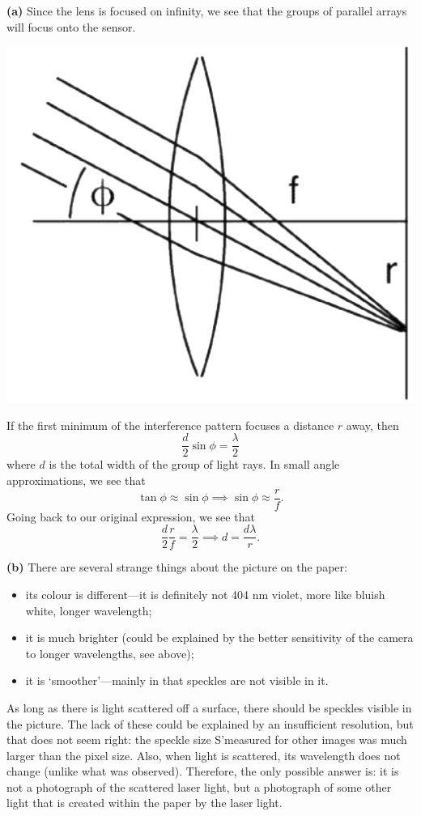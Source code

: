 \begin{custom-simple}[Problem 19]
\textbf{(a)} Since the lens is focused on infinity, we see that the groups of parallel arrays will focus onto the sensor. 
\begin{center}
    \includegraphics[width=0.5\linewidth]{kalda-physics-cup.png}
\end{center}
\vspace{5mm}
If the first minimum of the interference pattern focuses a distance $r$ away, then 
\[\frac{d}{2}\sin\phi = \frac{\lambda}{2}\]
where $d$ is the total width of the group of light rays. In small angle approximations, we see that 
\[\tan\phi \approx \sin\phi \implies \sin\phi \approx \frac{r}{f}.\]
Going back to our original expression, we see that 
\[\frac{d}{2}\frac{r}{f} = \frac{\lambda}{2}\implies d = \boxed{\frac{d\lambda}{r}}.\]

\textbf{(b)} There are several strange things about the picture on the paper:
\begin{itemize}
\item its colour is different—it is definitely not 404 nm violet, more like bluish white, longer wavelength;
\item it is much brighter (could be explained by the better sensitivity of the camera to longer wavelengths, see above);
\item it is ‘smoother’—mainly in that speckles are not visible in it.
\end{itemize}
As long as there is light scattered off a surface, there should be speckles visible in the picture. The lack of these could be explained by an insufficient resolution, but that does not seem right: the speckle size S'measured for other images was much larger than the pixel size. Also, when light is scattered, its wavelength does not change (unlike what was observed). Therefore, the only possible answer is: it is not a photograph of the scattered laser light, but a photograph of some other light that is created within the paper by the laser light.
\vspace{3mm}


\end{custom-simple}
